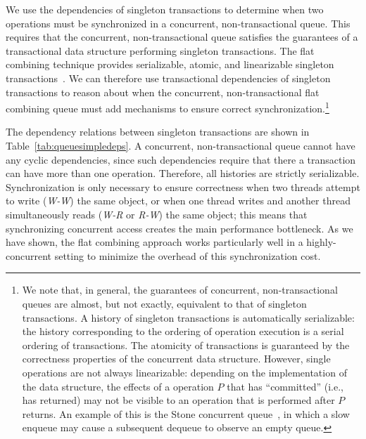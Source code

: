 We use the dependencies of singleton transactions to determine when two operations must be synchronized in a concurrent, non-transactional queue. This requires that the concurrent, non-transactional queue satisfies the guarantees of a transactional data structure performing singleton transactions.
The flat combining technique provides serializable, atomic, and linearizable singleton transactions~\cite{flatcombining}. We can therefore use transactional dependencies of singleton transactions to reason about when the concurrent, non-transactional flat combining queue must add mechanisms to ensure correct synchronization.\footnote{We note that, in general, the guarantees of concurrent, non-transactional queues are almost, but not exactly, equivalent to that of singleton transactions. A history of singleton transactions is automatically serializable: the history corresponding to the ordering of operation execution is a serial ordering of transactions. The atomicity of transactions is guaranteed by the correctness properties of the concurrent data structure. However, single operations are not always linearizable: depending on the implementation of the data structure, the effects of a operation $P$ that has ``committed'' (i.e., has returned) may not be visible to an operation that is performed after $P$ returns. An example of this is the Stone concurrent queue~\cite{stone}, in which a slow enqueue may cause a subsequent dequeue to observe an empty queue.}

The dependency relations between singleton transactions are shown in Table~\ref{tab:queuesimpledeps}. 
A concurrent, non-transactional queue cannot have any cyclic dependencies, since such dependencies require that there a transaction can have more than one operation. Therefore, all histories are strictly serializable. Synchronization is only necessary to ensure correctness when two threads attempt to write (\emph{W-W}) the same object, or when one thread writes and another thread simultaneously reads (\emph{W-R} or \emph{R-W}) the same object; this means that synchronizing concurrent access creates the main performance bottleneck. As we have shown, the flat combining approach works particularly well in a highly-concurrent setting to minimize the overhead of this synchronization cost.

